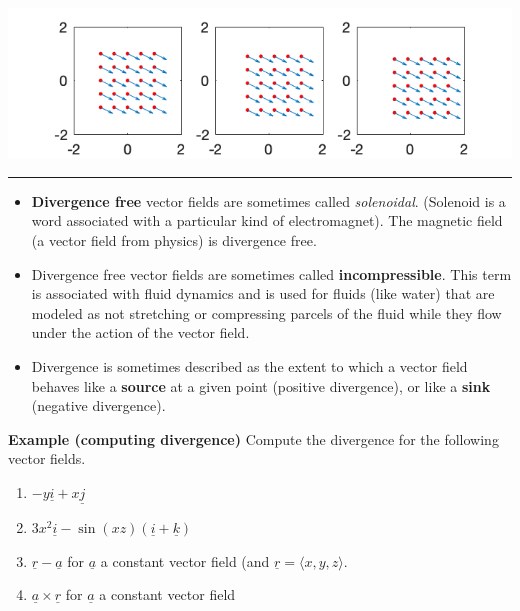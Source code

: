 \documentclass[12pt,letterpaper,noanswers]{exam}
\newcommand{\mb}[1]{\underline{#1}}
\begin{document}
\includegraphics[width=0.9\linewidth]{img/C26p1d.png}




\vspace{0.2cm}
\hrule
\vspace{0.2cm}

\begin{tcolorbox}
\begin{itemize}
\itemsep0em
    \item \textbf{Divergence free} vector fields are sometimes called \emph{solenoidal}.  (Solenoid is a word associated with a particular kind of electromagnet).  The magnetic field (a vector field from physics) is divergence free.
    \item Divergence free vector fields are sometimes called \textbf{incompressible}.  This term is associated with fluid dynamics and is used for fluids (like water) that are modeled as not stretching or compressing parcels of the fluid while they flow under the action of the vector field.
    \item Divergence is sometimes described as the extent to which a vector field behaves like a \textbf{source} at a given point (positive divergence), or like a \textbf{sink} (negative divergence).
\end{itemize}
\end{tcolorbox}

\noindent\textbf{Example (computing divergence)}
Compute the divergence for the following vector fields.
\begin{enumerate}
\itemsep3em
    \item $-y\mb i + x\mb j$
    \item $3x^2\mb i - \sin(xz)(\mb i + \mb k)$
    \item $\mb r - \mb a$ for $\mb a$ a constant vector field (and $\mb r = \langle x,y,z\rangle$.
    \item $\mb a\times \mb r$ for $\mb a$ a constant vector field
    \vspace{1.3in}
\end{enumerate}
\end{document}
